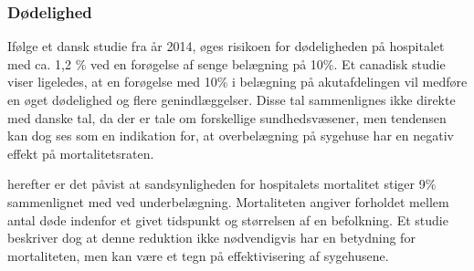 \subsubsection{Dødelighed}
Ifølge et dansk studie fra år 2014, øges risikoen for dødeligheden på hospitalet med ca. 1,2 \% ved en forøgelse af senge belægning på 10\%. \citep{Madsen2014}  Et canadisk studie viser ligeledes, at en forøgelse med 10\% i belægning på akutafdelingen vil medføre en øget dødelighed og flere genindlæggelser.\citep{McCusker2014} Disse tal sammenlignes ikke direkte med danske tal, da der er tale om forskellige sundhedsvæsener, men tendensen kan dog ses som en indikation for, at overbelægning på sygehuse har en negativ effekt på mortalitetsraten.

herefter er det påvist at sandsynligheden for hospitalets mortalitet stiger 9\% sammenlignet med ved underbelægning. \citep{Madsen2014}
Mortaliteten angiver forholdet mellem antal døde indenfor et givet tidspunkt og størrelsen af en befolkning. \citep{denstoredanskeordbog2} Et studie beskriver dog at denne reduktion ikke nødvendigvis har en betydning for mortaliteten, men kan være et tegn på effektivisering af sygehusene. \citep{Madsen2014}
